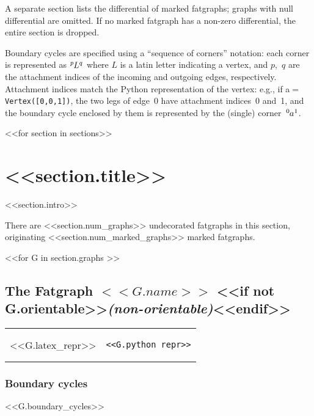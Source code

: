 \documentclass[a4paper]{article}
\newcommand{\corner}[3]{\ensuremath{\tensor[^{#2}]{#1}{^{#3}}}}
\begin{document}
A separate section lists the differential of marked fatgraphs; graphs
with null differential are omitted.  If no marked fatgraph has a
non-zero differential, the entire section is dropped.

Boundary cycles are specified using a ``sequence of corners''
notation: each corner is represented as \corner{L}{p}{q} where $L$ is
a latin letter indicating a vertex, and $p$,~$q$ are the attachment
indices of the incoming and outgoing edges, respectively.  Attachment
indices match the Python representation of the vertex: e.g., if
a$=$\verb'Vertex([0,0,1])', the two legs of edge~$0$ have attachment
indices~0 and~1, and the boundary cycle enclosed by them is
represented by the (single) corner~\corner{a}{0}{1}.

\clearpage


<<for section in sections>>
\section{<<section.title>>}
<<section.intro>>

There are <<section.num_graphs>> undecorated fatgraphs in this section,
originating <<section.num_marked_graphs>> marked fatgraphs.

<<for G in section.graphs >>
\vspace{2em}
\subsection{The Fatgraph $<<G.name>>$%
  <<if not G.orientable>>{\em (non-orientable)}<<endif>>}
\vspace{-1em}
\begin{tabular}{lr}
  \begin{minipage}{0.5\textwidth}
  {%
<<G.latex_repr>>
  }%
  \end{minipage}
  &%
  \begin{minipage}{0.4\textwidth}
\begin{verbatim}
<<G.python_repr>>
\end{verbatim}
  \end{minipage}
\end{tabular}
\vspace{-3em}

\subsubsection{Boundary cycles}
<<G.boundary_cycles>>
\end{document}
